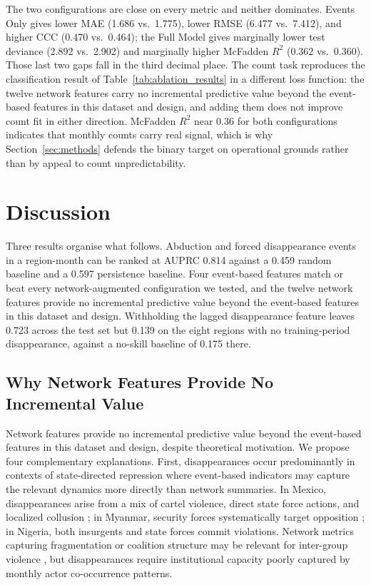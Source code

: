 \documentclass[pdflatex,sn-mathphys-num]{sn-jnl}%
\theoremstyle{thmstyleone}%
\theoremstyle{thmstyletwo}%
\theoremstyle{thmstylethree}%
\begin{document}
The two configurations are close on every metric and neither dominates. Events Only gives lower MAE (1.686 vs.\ 1.775), lower RMSE (6.477 vs.\ 7.412), and higher CCC (0.470 vs.\ 0.464); the Full Model gives marginally lower test deviance (2.892 vs.\ 2.902) and marginally higher McFadden $R^2$ (0.362 vs.\ 0.360). Those last two gaps fall in the third decimal place. The count task reproduces the classification result of Table~\ref{tab:ablation_results} in a different loss function: the twelve network features carry no incremental predictive value beyond the event-based features in this dataset and design, and adding them does not improve count fit in either direction. McFadden $R^2$ near 0.36 for both configurations indicates that monthly counts carry real signal, which is why Section~\ref{sec:methods} defends the binary target on operational grounds rather than by appeal to count unpredictability.

\section{Discussion}\label{sec:discussion}

Three results organise what follows. Abduction and forced disappearance events in a region-month can be ranked at AUPRC 0.814 against a 0.459 random baseline and a 0.597 persistence baseline. Four event-based features match or beat every network-augmented configuration we tested, and the twelve network features provide no incremental predictive value beyond the event-based features in this dataset and design. Withholding the lagged disappearance feature leaves 0.723 across the test set but 0.139 on the eight regions with no training-period disappearance, against a no-skill baseline of 0.175 there.

\subsection{Why Network Features Provide No Incremental Value}

Network features provide no incremental predictive value beyond the event-based features in this dataset and design, despite theoretical motivation. We propose four complementary explanations. First, disappearances occur predominantly in contexts of state-directed repression where event-based indicators may capture the relevant dynamics more directly than network summaries. In Mexico, disappearances arise from a mix of cartel violence, direct state force actions, and localized collusion \cite{umnmexico2024}; in Myanmar, security forces systematically target opposition \cite{hrwmyanmar2021}; in Nigeria, both insurgents and state forces commit violations. Network metrics capturing fragmentation or coalition structure may be relevant for inter-group violence \cite{dorff2020networks}, but disappearances require institutional capacity poorly captured by monthly actor co-occurrence patterns.
\end{document}
